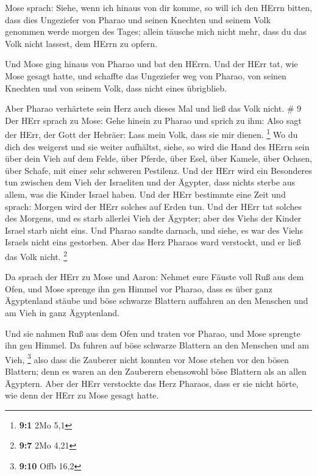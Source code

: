  Mose sprach: Siehe, wenn ich hinaus von dir komme, so will
ich den HErrn bitten, dass dies Ungeziefer von Pharao und seinen
Knechten und seinem Volk genommen werde morgen des Tages; allein täusche
mich nicht mehr, dass du das Volk nicht lassest, dem HErrn zu opfern.

 Und Mose ging hinaus von Pharao und bat den HErrn.
 Und der HErr tat, wie Mose gesagt hatte, und schaffte das
Ungeziefer weg von Pharao, von seinen Knechten und von seinem Volk, dass
nicht eines übrigblieb.

 Aber Pharao verhärtete sein Herz auch dieses Mal und ließ
das Volk nicht. \# 9  Der HErr sprach zu Mose: Gehe hinein
zu Pharao und sprich zu ihm: Also sagt der HErr, der Gott der Hebräer:
Lass mein Volk, dass sie mir dienen. \footnote{\textbf{9:1} 2Mo 5,1}
 Wo du dich des weigerst und sie weiter aufhältst,
 siehe, so wird die Hand des HErrn sein über dein Vieh auf
dem Felde, über Pferde, über Esel, über Kamele, über Ochsen, über
Schafe, mit einer sehr schweren Pestilenz.  Und der HErr
wird ein Besonderes tun zwischen dem Vieh der Israeliten und der
Ägypter, dass nichts sterbe aus allem, was die Kinder Israel haben.
 Und der HErr bestimmte eine Zeit und sprach: Morgen wird
der HErr solches auf Erden tun.  Und der HErr tat solches
des Morgens, und es starb allerlei Vieh der Ägypter; aber des Viehs der
Kinder Israel starb nicht eins.  Und Pharao sandte darnach,
und siehe, es war des Viehs Israels nicht eins gestorben. Aber das Herz
Pharaos ward verstockt, und er ließ das Volk nicht. \footnote{\textbf{9:7}
  2Mo 4,21}

 Da sprach der HErr zu Mose und Aaron: Nehmet eure Fäuste
voll Ruß aus dem Ofen, und Mose sprenge ihn gen Himmel vor Pharao,
 dass es über ganz Ägyptenland stäube und böse schwarze
Blattern auffahren an den Menschen und am Vieh in ganz Ägyptenland.

 Und sie nahmen Ruß aus dem Ofen und traten vor Pharao, und
Mose sprengte ihn gen Himmel. Da fuhren auf böse schwarze Blattern an
den Menschen und am Vieh, \footnote{\textbf{9:10} Offb 16,2}
 also dass die Zauberer nicht konnten vor Mose stehen vor
den bösen Blattern; denn es waren an den Zauberern ebensowohl böse
Blattern als an allen Ägyptern.  Aber der HErr verstockte
das Herz Pharaos, dass er sie nicht hörte, wie denn der HErr zu Mose
gesagt hatte.

